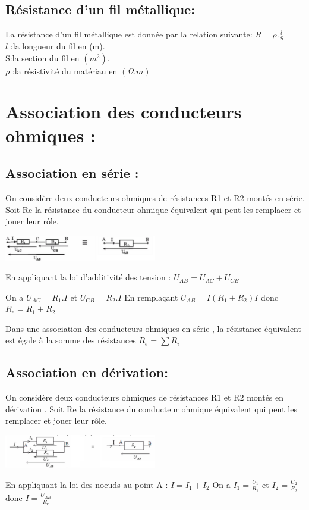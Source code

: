 \documentclass[12pt]{article}
\begin{document}
\subsection{Résistance d'un fil métallique:}
La résistance d'un fil métallique est donnée par la relation suivante: $R = \rho.\frac{l}{S}$
\\$l$  :la longueur du fil en (m).
\\S:la section du fil en $(m^2)$.
\\$\rho$ :la résistivité du matériau en $(\Omega.m)$

\section{Association des conducteurs ohmiques : }
\subsection{Association en série :}
On considère deux conducteurs ohmiques de résistances R1 et R2 montés en série.
Soit Re la résistance du conducteur ohmique équivalent qui peut les remplacer et jouer leur rôle.
\begin{center}
\includegraphics[width=0.5\textwidth]{./img/R_Serie.png}
\end{center}
En appliquant la loi d'additivité des tension : $U_{AB} = U_{AC} + U_{CB}$

On a  $U_{AC} = R_1.I$ et $U_{CB} = R_2.I$ En remplaçant $U_{AB} = I(R_1 + R_2)I$
donc $R_e = R_1 + R_2$
\begin{tcolorbox}{ }
Dans une association des conducteurs ohmiques en série , la résistance équivalent est égale à la somme des résistances $R_e = \sum R_i$
\end{tcolorbox}
  \subsection{Association en dérivation: }
On considère deux conducteurs ohmiques de résistances R1 et R2 montés en dérivation .
Soit Re la résistance du conducteur ohmique équivalent qui peut les remplacer et jouer leur rôle.
\begin{center}
\includegraphics[width=0.5\textwidth]{./img/derivation.png}
\end{center}
En appliquant la loi des noeuds au point A : $I = I_1 + I_2$
  On a $I_1 = \frac{U_1}{R_1}$ et $I_2 = \frac{U_2}{R_2}$ donc $I = \frac{U_{AB}}{R_e}$
   
\end{document}
